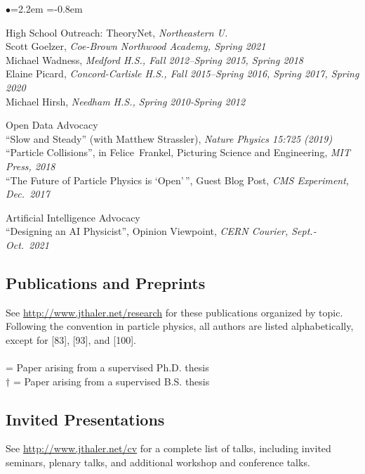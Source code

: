 \documentclass[11pt]{article}
\newcommand{\heading}[1]{\vspace{0in}\subsection*{#1} \vspace{.02in}}
\newcommand{\bbl}{\begin{list}{$\bullet$}{\leftmargin=2.2em \itemsep=-1pt \itemindent=-0.8em}}
\newcommand{\el}{\end{list}}
\begin{document}
\bbl
\item High School Outreach:  TheoryNet, \textit{Northeastern U.}
\\ Scott Goelzer, \textit{Coe-Brown Northwood Academy, Spring 2021}
\\ Michael Wadness, \textit{Medford H.S., Fall 2012--Spring 2015, Spring 2018}
\\ Elaine Picard, \textit{Concord-Carlisle H.S., Fall 2015--Spring 2016, Spring 2017, Spring 2020}
\\ Michael Hirsh, \textit{Needham H.S., Spring 2010-Spring 2012}
\item Open Data Advocacy
\\ ``Slow and Steady'' (with Matthew Strassler), \textit{Nature Physics 15:725 (2019)}
\\ ``Particle Collisions'', in Felice~Frankel, Picturing Science and Engineering, \textit{MIT Press, 2018}
\\ ``The Future of Particle Physics is `Open'\,'', Guest Blog Post, \textit{CMS Experiment, Dec.~2017}
\item Artificial Intelligence Advocacy
\\ ``Designing an AI Physicist'', Opinion Viewpoint, \textit{CERN Courier, Sept.-Oct.~2021}
\el




\heading{Publications and Preprints}

See \url{http://www.jthaler.net/research} for these publications organized by topic.  Following the convention in particle physics, all authors are listed alphabetically, except for [83], [93], and [100]. \\
~\\
\noindent * = Paper arising from a supervised Ph.D. thesis\\
\noindent $\dagger$ = Paper arising from a supervised B.S. thesis\\

\vspace{-.1in}
 



\heading{Invited Presentations}

See \url{http://www.jthaler.net/cv} for a complete list of talks, including invited seminars, plenary talks, and additional workshop and conference talks.\\
\end{document}
